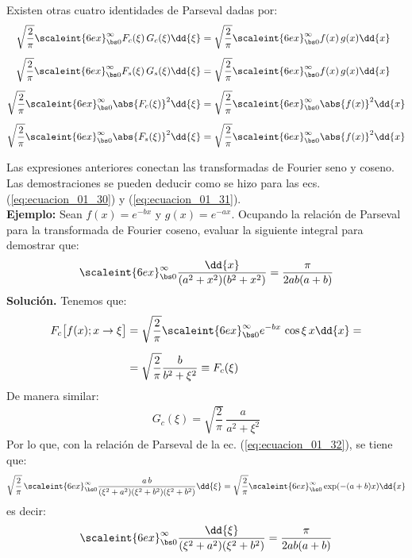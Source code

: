 Existen otras cuatro identidades de Parseval dadas por:
\begin{align}
\sqrt{\dfrac{2}{\pi}} \scaleint{6ex}_{\bs 0}^{\infty} F_{c} (\xi) \, G_{c} (\xi) \dd{\xi} &= \sqrt{\dfrac{2}{\pi}} \scaleint{6ex}_{\bs 0}^{\infty} f(x) \, g(x) \dd{x} \label{eq:ecuacion_01_32} \\[0.5em]
\sqrt{\dfrac{2}{\pi}} \scaleint{6ex}_{\bs 0}^{\infty} F_{s} (\xi) \, G_{s} (\xi) \dd{\xi} &= \sqrt{\dfrac{2}{\pi}} \scaleint{6ex}_{\bs 0}^{\infty} f(x) \, g(x) \dd{x} \label{eq:ecuacion_01_33} \\[0.5em]
\sqrt{\dfrac{2}{\pi}} \scaleint{6ex}_{\bs 0}^{\infty} \abs{F_{c} (\xi)}^{2} \dd{\xi} &= \sqrt{\dfrac{2}{\pi}} \scaleint{6ex}_{\bs 0}^{\infty} \abs{f(x)}^{2} \dd{x} \label{eq:ecuacion_01_34} \\[0.5em]
\sqrt{\dfrac{2}{\pi}} \scaleint{6ex}_{\bs 0}^{\infty} \abs{F_{s} (\xi)}^{2} \dd{\xi} &= \sqrt{\dfrac{2}{\pi}} \scaleint{6ex}_{\bs 0}^{\infty} \abs{f(x)}^{2} \dd{x} \label{eq:ecuacion_01_35}
\end{align}

Las expresiones anteriores conectan las transformadas de Fourier seno y coseno. Las demostraciones se pueden deducir como se hizo para las ecs. (\ref{eq:ecuacion_01_30}) y (\ref{eq:ecuacion_01_31}).
\\
\noindent
\textbf{Ejemplo:} Sean $f(x) = e^{-bx}$ y $g(x) = e^{-ax}$. Ocupando la relación de Parseval para la transformada de Fourier coseno, evaluar la siguiente integral para demostrar que:
\begin{align*}
\scaleint{6ex}_{\bs 0}^{\infty} \dfrac{\dd{x}}{(a^{2} + x^{2})(b^{2} + x^{2})} = \dfrac{\pi}{2 a b (a + b)}
\end{align*}
\textbf{Solución.} Tenemos que:
\begin{align*}
F_{c} \big[ f(x); x \to \xi \big] &= \sqrt{\dfrac{2}{\pi}} \scaleint{6ex}_{\bs 0}^{\infty} e^{-b x} \, \cos \xi \, x \dd{x} = \\[0.5em]
&= \sqrt{\dfrac{2}{\pi}} \dfrac{b}{b^{2} + \xi^{2}} \equiv F_{c} (\xi)
\end{align*}
De manera similar:
\begin{align*}
G_{c} (\xi) = \sqrt{\dfrac{2}{\pi}} \, \dfrac{a}{a^{2} + \xi^{2}}
\end{align*}
Por lo que, con la relación de Parseval de la ec. (\ref{eq:ecuacion_01_32}), se tiene que:
\begin{align*}
\sqrt{\dfrac{2}{\pi}} \, \scaleint{6ex}_{\bs 0}^{\infty} \dfrac{a \, b}{(\xi^{2} + a^{2})(\xi^{2} + b^{2})(\xi^{2} + b^{2})} \dd{\xi} = \sqrt{\dfrac{2}{\pi}} \scaleint{6ex}_{\bs 0}^{\infty} \exp(-(a + b) x) \dd{x}
\end{align*}
es decir:
\begin{align*}
\scaleint{6ex}_{\bs 0}^{\infty} \dfrac{\dd{\xi}}{(\xi^{2} + a^{2})(\xi^{2} + b^{2})} = \dfrac{\pi}{2 a b (a + b)}
\end{align*}


